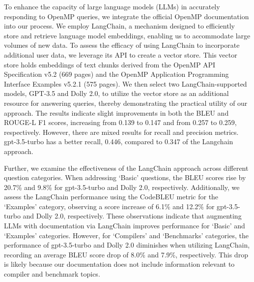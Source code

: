 To enhance the capacity of large language models (LLMs) in accurately responding to OpenMP queries, we integrate the official OpenMP documentation into our process. 
We employ LangChain, a mechanism designed to efficiently store and retrieve language model embeddings, enabling us to accommodate large volumes of new data. To assess the efficacy of using LangChain to incorporate additional user data, we leverage its API to create a vector store. This vector store holds embeddings of text chunks derived from the OpenMP API Specification v5.2 (669 pages) and the OpenMP Application Programming Interface Examples v5.2.1 (575 pages). We then select two LangChain-supported models, GPT-3.5 and Dolly 2.0, to utilize the vector store as an additional resource for answering queries, thereby demonstrating the practical utility of our approach.
The results indicate slight improvements in both the BLEU and ROUGE-L F1 scores, increasing from 0.139 to 0.147 and from 0.257 to 0.259, respectively. However, there are mixed results for recall and precision metrics. gpt-3.5-turbo has a better recall, 0.446, compared to 0.347 of the Langchain approach.  %

Further, we examine the effectiveness of the LangChain approach across different question categories. When addressing `Basic' questions, the BLEU scores rise by 20.7\% and 9.8\% for gpt-3.5-turbo and Dolly 2.0, respectively. Additionally, we assess the LangChain performance using the CodeBLEU metric\cite{ren2020codebleu} for the `Examples' category, observing a score increase of 6.1\% and 12.2\% for gpt-3.5-turbo and Dolly 2.0, respectively. These observations indicate that augmenting LLMs with documentation via LangChain improves performance for `Basic' and `Examples' categories. However, for `Compilers' and `Benchmarks' categories, the performance of gpt-3.5-turbo and Dolly 2.0 diminishes when utilizing LangChain, recording an average BLEU score drop of 8.0\% and 7.9\%, respectively. This drop is likely because our documentation does not include information relevant to compiler and benchmark topics.



